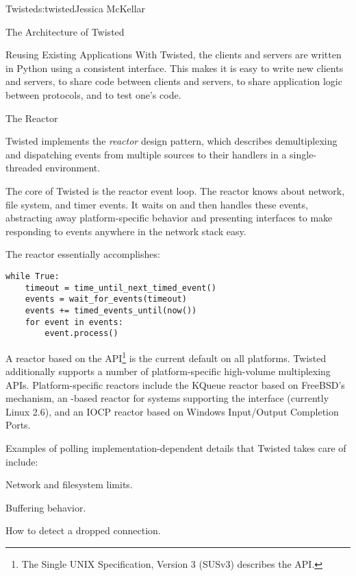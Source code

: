 \begin{aosachapter}{Twisted}{s:twisted}{Jessica McKellar}
\begin{aosasect1}{The Architecture of Twisted}
\begin{aosasect2}{Reusing Existing Applications}
With Twisted, the clients and servers are written in Python using a
consistent interface. This makes it is easy to write new clients and servers, to
share code between clients and servers, to share application logic between
protocols, and to test one's code.

\end{aosasect2}

\begin{aosasect2}{The Reactor}

Twisted implements the \emph{reactor} design pattern, which describes demultiplexing
and dispatching events from multiple sources to their handlers in a
single-threaded environment.

The core of Twisted is the reactor event loop. The reactor knows about network,
file system, and timer events. It waits on and then handles these events,
abstracting away platform-specific behavior and presenting interfaces to make
responding to events anywhere in the network stack easy.

The reactor essentially accomplishes:

\begin{verbatim}
while True:
    timeout = time_until_next_timed_event()
    events = wait_for_events(timeout)
    events += timed_events_until(now())
    for event in events:
        event.process()
\end{verbatim}

A reactor based on the  API\footnote{The Single UNIX
  Specification, Version 3 (SUSv3) describes the  API.} is
the current default on all platforms. Twisted additionally supports a
number of platform-specific high-volume multiplexing
APIs. Platform-specific reactors include the KQueue reactor based on
FreeBSD's  mechanism, an -based reactor for
systems supporting the  interface (currently Linux 2.6),
and an IOCP reactor based on Windows Input/Output Completion Ports.

Examples of polling implementation-dependent details that Twisted takes care
of include:

\begin{aosaitemize}

\item Network and filesystem limits.

\item Buffering behavior.

\item How to detect a dropped connection.


\end{aosaitemize}
\end{aosasect2}
\end{aosasect1}
\end{aosachapter}
